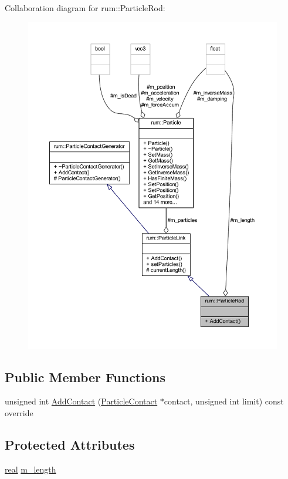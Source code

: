 Collaboration diagram for rum\+:\+:Particle\+Rod\+:\nopagebreak
\begin{figure}[H]
\begin{center}
\leavevmode
\includegraphics[width=350pt]{classrum_1_1_particle_rod__coll__graph}
\end{center}
\end{figure}
\subsection*{Public Member Functions}
\begin{DoxyCompactItemize}
\item 
unsigned int \hyperlink{classrum_1_1_particle_rod_abc0fad39193787cb65e937cd7d20874e}{Add\+Contact} (\hyperlink{classrum_1_1_particle_contact}{Particle\+Contact} $\ast$contact, unsigned int limit) const override
\end{DoxyCompactItemize}
\subsection*{Protected Attributes}
\begin{DoxyCompactItemize}
\item 
\hyperlink{namespacerum_a7e8cca23573d5eaead0f138cbaa4862c}{real} \hyperlink{classrum_1_1_particle_rod_a9f5c266ef3a91afc3f3c41b7c0f300a9}{m\+\_\+length}
\end{DoxyCompactItemize}

